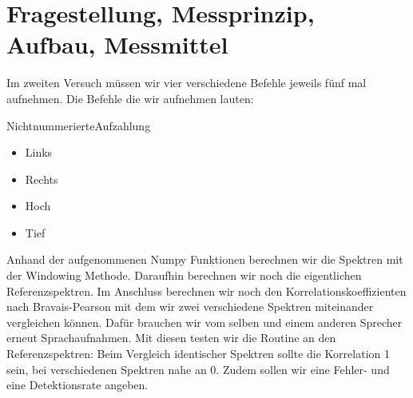 \documentclass[12pt, oneside, a4paper, \docLanguage]{report}
\begin{document}
\section{Fragestellung, Messprinzip, Aufbau, Messmittel}
\label{chap:VERSUCH_2_FRAGESTELLUNG}
Im zweiten Versuch müssen wir vier verschiedene Befehle jeweils fünf mal aufnehmen. 
\newline
Die Befehle die wir aufnehmen lauten:
\item[NichtnummerierteAufzahlung]~\par
   \begin{itemize}
      \item Links
      \item Rechts
      \item Hoch
      \item Tief
   \end{itemize}
Anhand der aufgenommenen Numpy Funktionen berechnen wir die Spektren mit der Windowing Methode.
Daraufhin berechnen wir noch die eigentlichen Referenzspektren.
\newline
Im Anschluss berechnen wir noch den Korrelationskoeffizienten nach Bravais-Pearson mit dem wir zwei verschiedene Spektren miteinander vergleichen können.
\newline
Dafür brauchen wir vom selben und einem anderen Sprecher erneut Sprachaufnahmen.
\newline
Mit diesen testen wir die Routine an den Referenzspektren: 
\newline
Beim Vergleich identischer Spektren sollte die Korrelation 1 sein, bei verschiedenen Spektren nahe an 0.
\newline
Zudem sollen wir eine Fehler- und eine Detektionsrate angeben.
\end{document}
